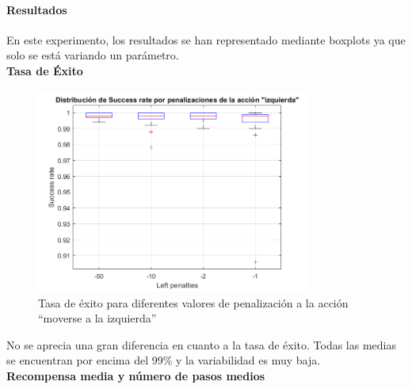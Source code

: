 \paragraph{Resultados}
En este experimento, los resultados se han representado mediante boxplots ya que solo se está variando un parámetro. 
\\

\newpage
\textbf{Tasa de Éxito}

\begin{figure}[H]
    \centering
    \includegraphics[width=0.8\textwidth]{../../experiments/qlearning/experiment-5/results/success.png}
    \caption{Tasa de éxito para diferentes valores de penalización a la acción ``moverse a la izquierda''}
    \label{fig:qlearning-success}
\end{figure}

No se aprecia una gran diferencia en cuanto a la tasa de éxito. Todas las medias se encuentran por encima del 99\% y la variabilidad es muy baja. 
\\

\newpage
\textbf{Recompensa media y número de pasos medios}


